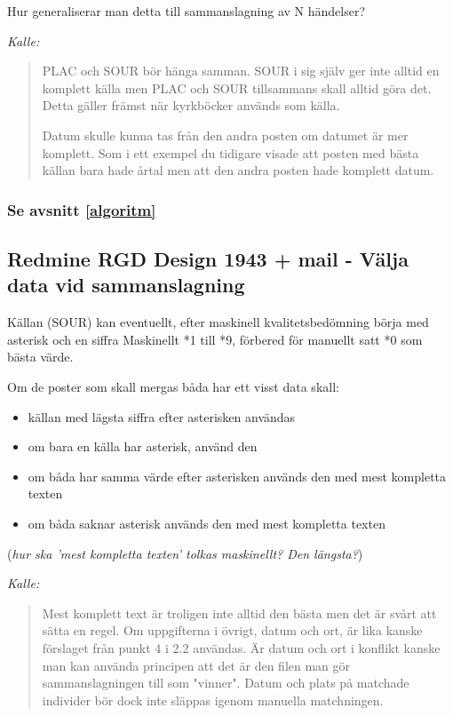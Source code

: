 \documentclass[swedish,11pt]{article}
\begin{document}
Hur generaliserar man detta till sammanslagning av N händelser?

{\it Kalle:}
\begin{quotation}
PLAC och SOUR bör hänga samman. SOUR i sig själv ger inte alltid en komplett källa men PLAC och SOUR tillsammans skall alltid göra det. Detta gäller främst när kyrkböcker används som källa.

Datum skulle kunna tas från den andra posten om datumet är mer komplett. Som i ett exempel du tidigare visade att posten med bästa källan bara hade årtal men att den andra posten hade komplett datum.
\end{quotation}

\subsubsection{Se avsnitt \ref{algoritm}}

\subsection{Redmine RGD Design 1943 + mail - Välja data vid sammanslagning}
\label{redmine1943}
Källan (SOUR) kan eventuellt, efter maskinell kvalitetsbedömning börja med asterisk och en siffra
Maskinellt *1 till *9, förbered för manuellt satt *0 som bästa värde.

Om de poster som skall mergas båda har ett visst data skall:
\begin{itemize}
\item källan med lägsta siffra efter asterisken användas
\item om bara en källa har asterisk, använd den
\item om båda har samma värde efter asterisken används den med mest kompletta texten
\item om båda saknar asterisk används den med mest kompletta texten
\end{itemize}
  ({\it hur ska 'mest kompletta texten' tolkas maskinellt? Den längsta?})

{\it Kalle:}
\begin{quotation}
Mest komplett text är troligen inte alltid den bästa men det är svårt att sätta en regel.
Om uppgifterna i övrigt, datum och ort, är lika kanske förslaget från punkt 4 i 2.2 användas.
Är datum och ort i konflikt kanske man kan använda principen att det är den filen man gör sammanslagningen till som "vinner". Datum och plats på matchade individer bör dock inte släppas igenom manuella matchningen.
\end{quotation}
\end{document}

